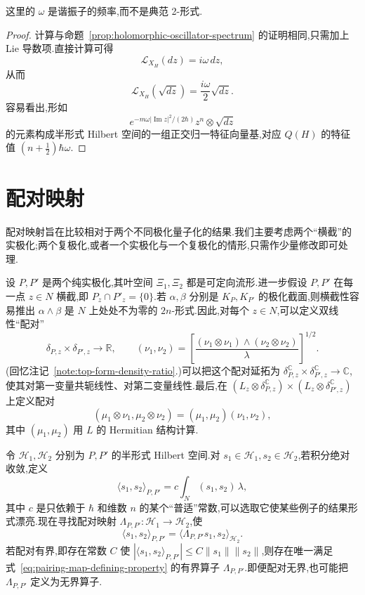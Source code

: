 这里的 $\omega$ 是谐振子的频率,而不是典范 2-形式.

\begin{proof}
计算与命题~\ref{prop:holomorphic-oscillator-spectrum} 的证明相同,只需加上 Lie 导数项.直接计算可得
\[
 \mathcal L_{X_H}(dz)=i\omega\,dz,
\]
从而
\[
 \mathcal L_{X_H}(\sqrt{dz})=\frac{i\omega}{2}\sqrt{dz}.
\]
容易看出,形如
\[
 e^{-m\omega|\operatorname{Im}z|^2/(2\hbar)}z^n\otimes\sqrt{dz}
\]
的元素构成半形式 Hilbert 空间的一组正交归一特征向量基,对应 $Q(H)$ 的特征值 $(n+\tfrac12)\hbar\omega$.
\end{proof}

\section{配对映射}
\label{sec:pairing-maps}

配对映射旨在比较相对于两个不同极化量子化的结果.我们主要考虑两个“横截”的实极化;两个复极化,或者一个实极化与一个复极化的情形,只需作少量修改即可处理.

设 $P,P'$ 是两个纯实极化,其叶空间 $\Xi_1,\Xi_2$ 都是可定向流形.进一步假设 $P,P'$ 在每一点 $z\in N$ 横截,即 $P_z\cap P'_z=\{0\}$.若 $\alpha,\beta$ 分别是 $K_P,K_{P'}$ 的极化截面,则横截性容易推出 $\alpha\wedge\beta$ 是 $N$ 上处处不为零的 $2n$-形式.因此,对每个 $z\in N$,可以定义双线性“配对”
\[
 \delta_{P,z}\times\delta_{P',z}\to\mathbb R,
 \qquad
 (\nu_1,\nu_2)=\left[
 \frac{(\nu_1\otimes\nu_1)\wedge(\nu_2\otimes\nu_2)}{\lambda}
 \right]^{1/2}.
 \label{eq:pointwise-pairing-half-forms}
\]
(回忆注记~\ref{note:top-form-density-ratio}.)可以把这个配对延拓为
$\delta_{P,z}^{\mathbb C}\times\delta_{P',z}^{\mathbb C}\to\mathbb C$,使其对第一变量共轭线性、对第二变量线性.最后,在
$(L_z\otimes\delta_{P,z}^{\mathbb C})\times(L_z\otimes\delta_{P',z}^{\mathbb C})$ 上定义配对
\[
 (\mu_1\otimes\nu_1,\mu_2\otimes\nu_2)
 =(\mu_1,\mu_2)(\nu_1,\nu_2),
\]
其中 $(\mu_1,\mu_2)$ 用 $L$ 的 Hermitian 结构计算.

令 $\mathcal H_1,\mathcal H_2$ 分别为 $P,P'$ 的半形式 Hilbert 空间.对 $s_1\in\mathcal H_1,s_2\in\mathcal H_2$,若积分绝对收敛,定义
\[
 \langle s_1,s_2\rangle_{P,P'}
 =c\int_N(s_1,s_2)\,\lambda,
 \label{eq:polarization-pairing}
\]
其中 $c$ 是只依赖于 $\hbar$ 和维数 $n$ 的某个“普适”常数,可以选取它使某些例子的结果形式漂亮.现在寻找配对映射 $\Lambda_{P,P'}:\mathcal H_1\to\mathcal H_2$,使
\[
 \langle s_1,s_2\rangle_{P,P'}
 =\langle\Lambda_{P,P'}s_1,s_2\rangle_{\mathcal H_2}.
 \label{eq:pairing-map-defining-property}
\]
若配对有界,即存在常数 $C$ 使 $|\langle s_1,s_2\rangle_{P,P'}|\le C\|s_1\|\|s_2\|$,则存在唯一满足式~\eqref{eq:pairing-map-defining-property} 的有界算子 $\Lambda_{P,P'}$.即便配对无界,也可能把 $\Lambda_{P,P'}$ 定义为无界算子.

